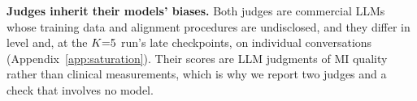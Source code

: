 \textbf{Judges inherit their models' biases.}
Both judges are commercial LLMs whose training data and alignment procedures are undisclosed, and
they differ in level and, at the $K{=}5$ run's late checkpoints, on individual conversations
(Appendix~\ref{app:saturation}). Their scores are LLM judgments of MI quality rather than clinical
measurements, which is why we report two judges and a check that involves no model.


